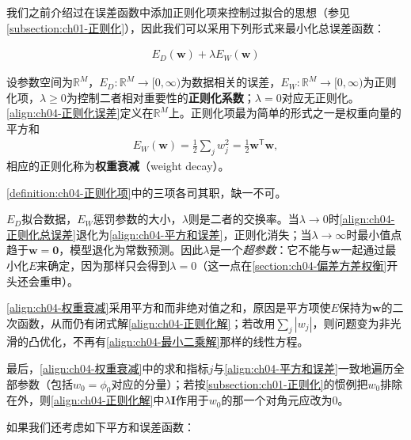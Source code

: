 \documentclass[../../main.tex]{subfiles}
\begin{document}
我们之前介绍过在误差函数中添加正则化项来控制过拟合的思想（参见\cref{subsection:ch01-正则化}），因此我们可以采用下列形式来最小化总误差函数：

\begin{align}
  E_D(\boldsymbol{w})+\lambda E_W(\boldsymbol{w})
  \label{align:ch04-正则化误差}
\end{align}

\begin{definition}[正则化项与权重衰减]\label{definition:ch04-正则化项}
设参数空间为$\mathbb{R}^{M}$，$E_D:\mathbb{R}^{M}\to[0,\infty)$为数据相关的误差，$E_W:\mathbb{R}^{M}\to[0,\infty)$为正则化项，$\lambda\geqslant0$为控制二者相对重要性的\textbf{正则化系数}；$\lambda=0$对应无正则化。\eqref{align:ch04-正则化误差}定义在$\mathbb{R}^{M}$上。正则化项最为简单的形式之一是权重向量的平方和
\begin{align}
  E_W(\boldsymbol{w})=\frac{1}{2}\sum_{j}w_j^2=\frac{1}{2}\boldsymbol{w}^{\mathsf{T}}\boldsymbol{w},
  \label{align:ch04-权重衰减}
\end{align}
相应的正则化称为\textbf{权重衰减}（weight decay）。
\end{definition}

\begin{remark}
\cref{definition:ch04-正则化项}中的三项各司其职，缺一不可。

$E_D$拟合数据，$E_W$惩罚参数的大小，$\lambda$则是二者的交换率。当$\lambda\to0$时\eqref{align:ch04-正则化总误差}退化为\eqref{align:ch04-平方和误差}，正则化消失；当$\lambda\to\infty$时最小值点趋于$\boldsymbol{w}=\boldsymbol{0}$，模型退化为常数预测。因此$\lambda$是一个\emph{超参数}：它不能与$\boldsymbol{w}$一起通过最小化$E$来确定，因为那样只会得到$\lambda=0$（这一点在\cref{section:ch04-偏差方差权衡}开头还会重申）。

\eqref{align:ch04-权重衰减}采用平方和而非绝对值之和，原因是平方项使$E$保持为$\boldsymbol{w}$的二次函数，从而仍有闭式解\eqref{align:ch04-正则化解}；若改用$\sum_j|w_j|$，则问题变为非光滑的凸优化，不再有\eqref{align:ch04-最小二乘解}那样的线性方程。

最后，\eqref{align:ch04-权重衰减}中的求和指标$j$与\eqref{align:ch04-平方和误差}一致地遍历全部参数（包括$w_0=\phi_0$对应的分量）；若按\cref{subsection:ch01-正则化}的惯例把$w_0$排除在外，则\eqref{align:ch04-正则化解}中$\lambda\boldsymbol{I}$作用于$w_0$的那一个对角元应改为$0$。
\end{remark}

如果我们还考虑如下平方和误差函数：
\end{document}
